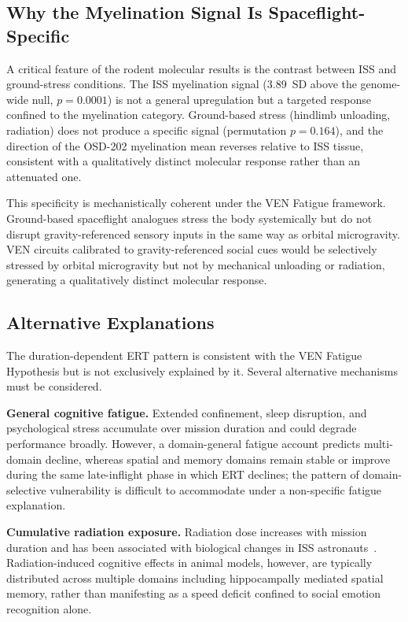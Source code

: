 \documentclass[11pt]{article}
\begin{document}
\subsection{Why the Myelination Signal Is Spaceflight-Specific}

A critical feature of the rodent molecular results is the contrast between
ISS and ground-stress conditions.
The ISS myelination signal (3.89~SD above the genome-wide null,
$p=0.0001$) is not a general upregulation but a targeted response confined
to the myelination category.
Ground-based stress (hindlimb unloading, radiation) does not produce a
specific signal (permutation $p=0.164$), and the direction of the OSD-202
myelination mean reverses relative to ISS tissue, consistent with a
qualitatively distinct molecular response rather than an attenuated one.

This specificity is mechanistically coherent under the VEN Fatigue
framework.
Ground-based spaceflight analogues stress the body systemically but do not
disrupt gravity-referenced sensory inputs in the same way as orbital
microgravity.
VEN circuits calibrated to gravity-referenced social cues would be
selectively stressed by orbital microgravity but not by mechanical
unloading or radiation, generating a qualitatively distinct molecular
response.

\subsection{Alternative Explanations}
\label{sec:alternatives}

The duration-dependent ERT pattern is consistent with the VEN Fatigue
Hypothesis but is not exclusively explained by it.
Several alternative mechanisms must be considered.

\textbf{General cognitive fatigue.}
Extended confinement, sleep disruption, and psychological stress accumulate
over mission duration and could degrade performance broadly.
However, a domain-general fatigue account predicts multi-domain decline,
whereas spatial and memory domains remain stable or improve during the same
late-inflight phase in which ERT declines; the pattern of domain-selective
vulnerability is difficult to accommodate under a non-specific fatigue
explanation.

\textbf{Cumulative radiation exposure.}
Radiation dose increases with mission duration and has been associated with
biological changes in ISS astronauts~\cite{garrett2019}.
Radiation-induced cognitive effects in animal models, however, are typically
distributed across multiple domains including hippocampally mediated spatial
memory, rather than manifesting as a speed deficit confined to social emotion
recognition alone.
\end{document}
